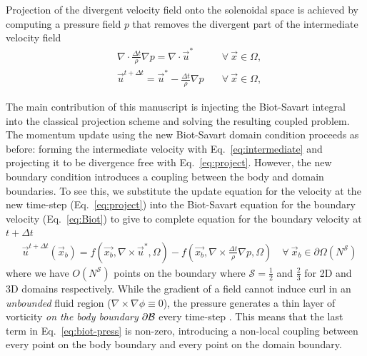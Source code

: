 \documentclass[final,1p,times]{elsarticle}
\begin{document}
Projection of the divergent velocity field onto the solenoidal space is achieved by computing a pressure field $p$ that removes the divergent part of the intermediate velocity field
\begin{align}\label{eq:poisson}
      &\nabla\cdot\frac{\Delta t}{\rho}\nabla p = \nabla\cdot \vec{u}^* &\quad\forall\ \vec{x}\in\Omega,\\
      \label{eq:project}
      &\vec{u}^{t+\Delta t} = \vec{u}^*-\frac{\Delta t}{\rho}\nabla p &\quad\forall\ \vec{x}\in\Omega,
\end{align}

The main contribution of this manuscript is injecting the Biot-Savart integral into the classical projection scheme and solving the resulting coupled problem. The momentum update using the new Biot-Savart domain condition proceeds as before: forming the intermediate velocity with Eq.~\ref{eq:intermediate} and projecting it to be divergence free with Eq.~\ref{eq:project}. However, the new boundary condition introduces a coupling between the body and domain boundaries. To see this, we substitute the update equation for the velocity at the new time-step (Eq.~\ref{eq:project}) into the Biot-Savart equation for the boundary velocity (Eq.~\ref{eq:Biot}) to give to complete equation for the boundary velocity at $t+\Delta t$
\begin{align}\label{eq:biot-press}
    &\vec{u}^{t+\Delta t}(\vec x_b) = f(\vec{x_b},\nabla\times\vec{u}^*,\Omega)-f\left(\vec{x_b},\nabla\times\frac{\Delta t}{\rho}\nabla p,\Omega\right) \quad\forall\ \vec{x}_b \in \partial\Omega(N^\mathcal{S})
\end{align}
where we have $O(N^\mathcal{S})$ points on the boundary where $\mathcal{S}=\tfrac12$ and $\tfrac 23$ for 2D and 3D domains respectively. While the gradient of a field cannot induce curl in an \textit{unbounded} fluid region ($\nabla\times\nabla\phi\equiv 0$), the pressure generates a thin layer of vorticity \textit{on the body boundary} $\partial\cal B$ every time-step \cite{Morton1984GeophysicalTy}. This means that the last term in Eq.~\ref{eq:biot-press} is non-zero, introducing a non-local coupling between every point on the body boundary and every point on the domain boundary.
\end{document}
